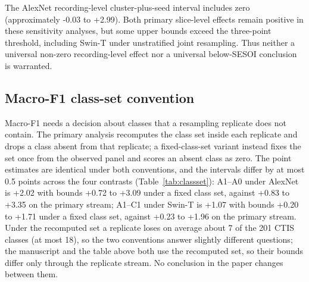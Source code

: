 The AlexNet recording-level cluster-plus-seed interval includes zero (approximately -0.03 to +2.99). Both primary slice-level effects remain positive in these sensitivity analyses, but some upper bounds exceed the three-point threshold, including Swin-T under unstratified joint resampling. Thus neither a universal non-zero recording-level effect nor a universal below-SESOI conclusion is warranted.

\subsection{Macro-F1 class-set convention}

Macro-F1 needs a decision about classes that a resampling replicate does not contain. The primary
analysis recomputes the class set inside each replicate and drops a class absent from that
replicate; a fixed-class-set variant instead fixes the set once from the observed panel and scores
an absent class as zero. The point estimates are identical under both conventions, and the intervals
differ by at most 0.5 points across the four contrasts (Table~\ref{tab:classset}): A1--A0 under
AlexNet is +2.02 with bounds +0.72 to +3.09 under a fixed class set, against +0.83 to +3.35 on the
primary stream; A1--C1 under Swin-T is +1.07 with bounds +0.20 to +1.71 under a fixed class set,
against +0.23 to +1.96 on the primary stream. Under the recomputed set a
replicate loses on average about 7 of the 201 CTIS classes (at most 18), so the two conventions answer
slightly different questions; the manuscript and the table above both use the recomputed set, so
their bounds differ only through the replicate stream.
No conclusion in the paper changes between them.

